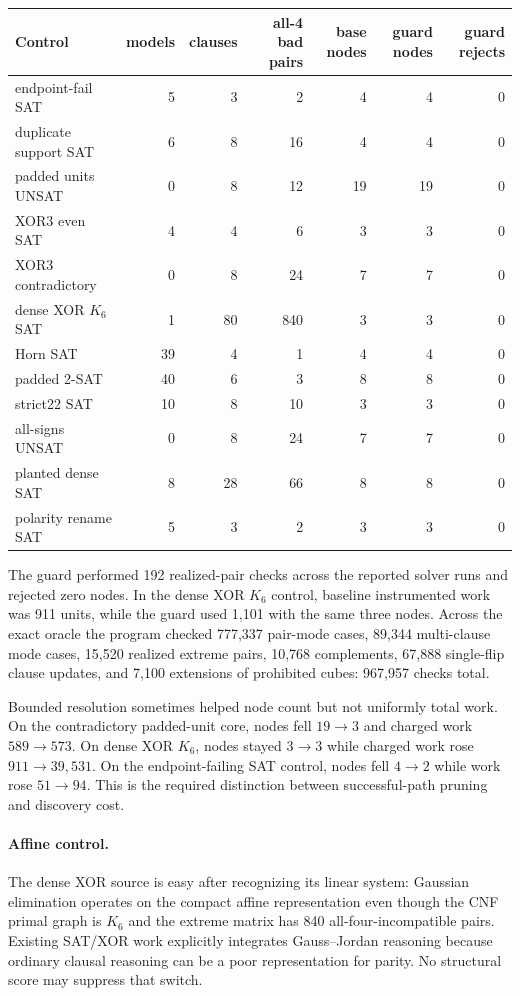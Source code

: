 \documentclass[10pt]{article}
\begin{document}
\begin{longtable}{p{3.25cm}rrrrrr}
\toprule
Control & models & clauses & all-4 bad pairs & base nodes & guard nodes & guard rejects\\
\midrule
endpoint-fail SAT & 5 & 3 & 2 & 4 & 4 & 0\\
duplicate support SAT & 6 & 8 & 16 & 4 & 4 & 0\\
padded units UNSAT & 0 & 8 & 12 & 19 & 19 & 0\\
XOR3 even SAT & 4 & 4 & 6 & 3 & 3 & 0\\
XOR3 contradictory & 0 & 8 & 24 & 7 & 7 & 0\\
dense XOR $K_6$ SAT & 1 & 80 & 840 & 3 & 3 & 0\\
Horn SAT & 39 & 4 & 1 & 4 & 4 & 0\\
padded 2-SAT & 40 & 6 & 3 & 8 & 8 & 0\\
strict22 SAT & 10 & 8 & 10 & 3 & 3 & 0\\
all-signs UNSAT & 0 & 8 & 24 & 7 & 7 & 0\\
planted dense SAT & 8 & 28 & 66 & 8 & 8 & 0\\
polarity rename SAT & 5 & 3 & 2 & 3 & 3 & 0\\
\bottomrule
\end{longtable}

The guard performed 192 realized-pair checks across the reported solver runs and
rejected zero nodes.  In the dense XOR $K_6$ control, baseline instrumented work was
911 units, while the guard used 1,101 with the same three nodes.  Across the exact
oracle the program checked 777,337 pair-mode cases, 89,344 multi-clause mode cases,
15,520 realized extreme pairs, 10,768 complements, 67,888 single-flip clause updates,
and 7,100 extensions of prohibited cubes: 967,957 checks total.

Bounded resolution sometimes helped node count but not uniformly total work.  On the
contradictory padded-unit core, nodes fell $19\to3$ and charged work $589\to573$.
On dense XOR $K_6$, nodes stayed $3\to3$ while charged work rose $911\to39{,}531$.
On the endpoint-failing SAT control, nodes fell $4\to2$ while work rose $51\to94$.
This is the required distinction between successful-path pruning and discovery cost.

\paragraph{Affine control.}
The dense XOR source is easy after recognizing its linear system: Gaussian elimination
operates on the compact affine representation even though the CNF primal graph is
$K_6$ and the extreme matrix has 840 all-four-incompatible pairs.  Existing SAT/XOR
work explicitly integrates Gauss--Jordan reasoning because ordinary clausal reasoning
can be a poor representation for parity.  No structural score may suppress that switch.
\end{document}
